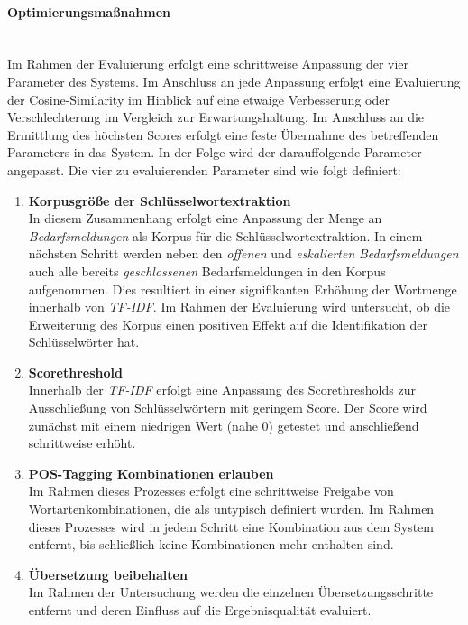 \paragraph{Optimierungsmaßnahmen}\label{sec:optimierungsmaßnahmen}\mbox{}\\
Im Rahmen der Evaluierung erfolgt eine schrittweise Anpassung der vier Parameter des Systems. Im Anschluss an jede Anpassung erfolgt eine Evaluierung der Cosine-Similarity im Hinblick auf eine etwaige Verbesserung oder Verschlechterung im Vergleich zur Erwartungshaltung. Im Anschluss an die Ermittlung des höchsten Scores erfolgt eine feste Übernahme des betreffenden Parameters in das System. In der Folge wird der darauffolgende Parameter angepasst. Die vier zu evaluierenden Parameter sind wie folgt definiert:
\begin{enumerate}
	\item \textbf{Korpusgröße der Schlüsselwortextraktion} \\ In diesem Zusammenhang erfolgt eine Anpassung der Menge an \emph{Bedarfsmeldungen} als Korpus für die Schlüsselwortextraktion. In einem nächsten Schritt werden neben den \emph{offenen} und \emph{eskalierten} \emph{Bedarfsmeldungen} auch alle bereits \emph{geschlossenen} Bedarfsmeldungen in den Korpus aufgenommen. Dies resultiert in einer signifikanten Erhöhung der Wortmenge innerhalb von \emph{TF-IDF}. Im Rahmen der Evaluierung wird untersucht, ob die Erweiterung des Korpus einen positiven Effekt auf die Identifikation der Schlüsselwörter hat.
	\item \textbf{Scorethreshold} \\ Innerhalb der \emph{TF-IDF} erfolgt eine Anpassung des Scorethresholds zur Ausschließung von Schlüsselwörtern mit geringem Score. Der Score wird zunächst mit einem niedrigen Wert (nahe 0) getestet und anschließend schrittweise erhöht.
	\item \textbf{POS-Tagging Kombinationen erlauben} \\ Im Rahmen dieses Prozesses erfolgt eine schrittweise Freigabe von Wortartenkombinationen, die als untypisch definiert wurden. Im Rahmen dieses Prozesses wird in jedem Schritt eine Kombination aus dem System entfernt, bis schließlich keine Kombinationen mehr enthalten sind.
	\item \textbf{Übersetzung beibehalten} \\ Im Rahmen der Untersuchung werden die einzelnen Übersetzungsschritte entfernt und deren Einfluss auf die Ergebnisqualität evaluiert.
\end{enumerate}

